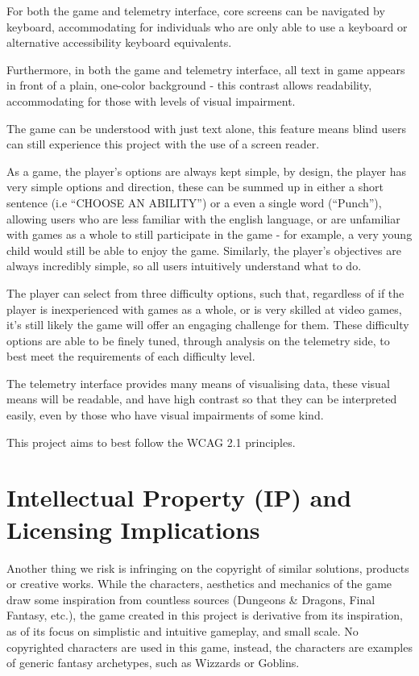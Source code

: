 \documentclass[11pt]{article}
\begin{document}
For both the game and telemetry interface, core screens can be navigated by keyboard, accommodating for individuals who are only able to use a keyboard or alternative accessibility keyboard equivalents. 

Furthermore, in both the game and telemetry interface, all text in game appears in front of a plain, one-color background - this contrast allows readability, accommodating for those with levels of visual impairment. 

The game can be understood with just text alone, this feature means blind users can still experience this project with the use of a screen reader. 

As a game, the player’s options are always kept simple, by design, the player has very simple options and direction, these can be summed up in either a short sentence (i.e “CHOOSE AN ABILITY”) or a even a single word (“Punch”), allowing users who are less familiar with the english language, or are unfamiliar with games as a whole to still participate in the game - for example, a very young child would still be able to enjoy the game. Similarly, the player’s objectives are always incredibly simple, so all users intuitively understand what to do.

The player can select from three difficulty options, such that, regardless of if the player is inexperienced with games as a whole, or is very skilled at video games, it’s still likely the game will offer an engaging challenge for them. These difficulty options are able to be finely tuned, through analysis on the telemetry side, to best meet the requirements of each difficulty level.

The telemetry interface provides many means of visualising data, these visual means will be readable, and have high contrast so that they can be interpreted easily, even by those who have visual impairments of some kind.
   
This project aims to best follow the WCAG 2.1 principles.

\section{Intellectual Property (IP) and Licensing Implications}
    
Another thing we risk is infringing on the copyright of similar solutions, products or creative works. While the characters, aesthetics and mechanics of the game draw some inspiration from countless sources (Dungeons \& Dragons, Final Fantasy, etc.), the game created in this project is derivative from its inspiration, as of its focus on simplistic and intuitive gameplay, and small scale. No copyrighted characters are used in this game, instead, the characters are examples of generic fantasy archetypes, such as Wizzards or Goblins. 
\end{document}
